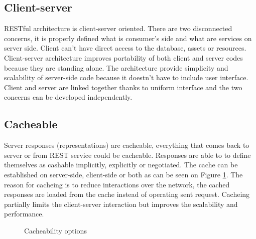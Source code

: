 \subsection{Client-server}

RESTful architecture is client-server oriented. There are two disconnected concerns, it is properly defined what is consumer's side and what are services on server side. Client can’t have direct access to the database, assets or resources. Client-server architecture improves portability of both client and server codes because they are standing alone. The architecture provide simplicity and scalability of server-side code because it doestn't have to include user interface. Client and server are linked together thanks to uniform interface and the two concerns can be developed independently.

\subsection{Cacheable}

Server responses (representations) are cacheable, everything that comes back to server or from REST service could be cacheable. Responses are able to to define themselves as cashable implicitly, explicitly or negotiated. The cache can be established on server-side, client-side or both as can be seen on Figure \ref{fig:cacheability}. The reason for cacheing is to reduce interactions over the network, the cached responses are loaded from the cache instead of operating sent request. %
Cacheing partially limits the client-server interaction but improves the scalability and performance. 


\begin{figure}[htp] 
\caption{Cacheability options}
\label{fig:cacheability}
\end{figure} 

